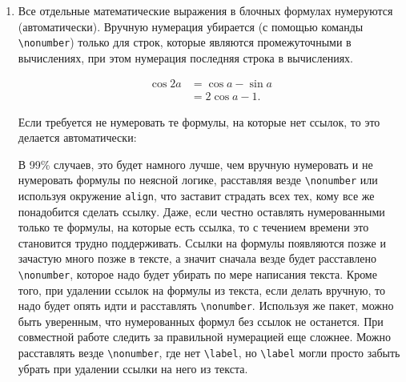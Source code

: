 \documentclass[12pt, a4paper]{article}
\begin{document}
\begin{enumerate}
\begin{enumerate}
			\item Если последующая строка при переносе начинается не со знака равно, то её содержимое рекомендуется подвинуть правее с помощью команды \verb|\quad|:
\begin{example}
\begin{align}
	\cos 2a & = \cos a -
		\nonumber \\
		& \quad - \sin a
		\nonumber \\
		& = 2\cos a - 1.
\end{align}
\end{example}
			Так визуально проще отделять шаги вычислений друг от друга.
	\end{enumerate}
	\item Все отдельные математические выражения в блочных формулах нумеруются (автоматически). Вручную нумерация убирается (с помощью команды \verb|\nonumber|) только для строк, которые являются промежуточными в вычислениях, при этом нумерация последняя строка в вычислениях.
\begin{example}
\begin{align}
	\cos 2a & = \cos a - \sin a
		\nonumber \\
		& = 2\cos a - 1.
\end{align}
\end{example}
	Если требуется не нумеровать те формулы, на которые нет ссылок, то это делается автоматически:
\begin{listingonly}
	\usepackage{mathtools}
\end{listingonly}
	В 99\% случаев, это будет намного лучше, чем вручную нумеровать и не нумеровать формулы по неясной логике, расставляя везде \verb|\nonumber| или используя окружение \texttt{align}, что заставит страдать всех тех, кому все же понадобится сделать ссылку. Даже, если честно оставлять нумерованными только те формулы, на которые есть ссылка, то с течением времени это становится трудно поддерживать. Ссылки на формулы появляются позже и зачастую много позже в тексте, а значит сначала везде будет расставлено \verb|\nonumber|, которое надо будет убирать по мере написания текста. Кроме того, при удалении ссылок на формулы из текста, если делать вручную, то надо будет опять идти и расставлять \verb|\nonumber|. Используя же пакет, можно быть уверенным, что нумерованных формул без ссылок не останется. При совместной работе следить за правильной нумерацией еще сложнее. Можно расставлять везде \verb|\nonumber|, где нет \verb|\label|, но \verb|\label| могли просто забыть убрать при удалении ссылки на него из текста.
\end{enumerate}
\end{document}
